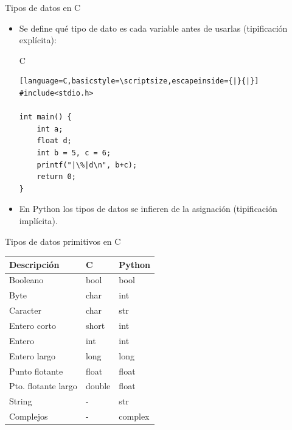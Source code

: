\documentclass{beamer}
\begin{document}
\begin{frame}[fragile]{Tipos de datos en C}
\begin{itemize}
	\item Se define qué tipo de dato es cada variable antes de usarlas (tipificación explícita):
	\begin{exampleblock}{C}
		\begin{lstlisting}[language=C,basicstyle=\scriptsize,escapeinside={|}{|}]
#include<stdio.h>

int main() {
	int a;
	float d;
	int b = 5, c = 6;
	printf("|\%|d\n", b+c);
	return 0;
}
		\end{lstlisting}
	\end{exampleblock}
	\item En Python los tipos de datos se infieren de la asignación (tipificación implícita).
\end{itemize}
\end{frame}

\begin{frame}[fragile]{Tipos de datos primitivos en C}
\vspace{-.25cm}
\begin{center}
	\begin{tabular}{|l|l|l|}\hline \hline
		\textbf{Descripción} & \textbf{C} & \textbf{Python}   \\ \hline \hline
		Booleano       &  bool &  bool \\
		Byte           &  char  & int \\
		Caracter       &  char  & str \\
		Entero corto   &  short & int \\
		Entero         &  int  & int \\
		Entero largo   & long  & long \\
		Punto flotante & float & float   \\
		Pto. flotante largo & double & float   \\
		String              & - & str \\ 
		Complejos  & - & complex \\ \hline
	\end{tabular}
\end{center}
\end{frame}
\end{document}
